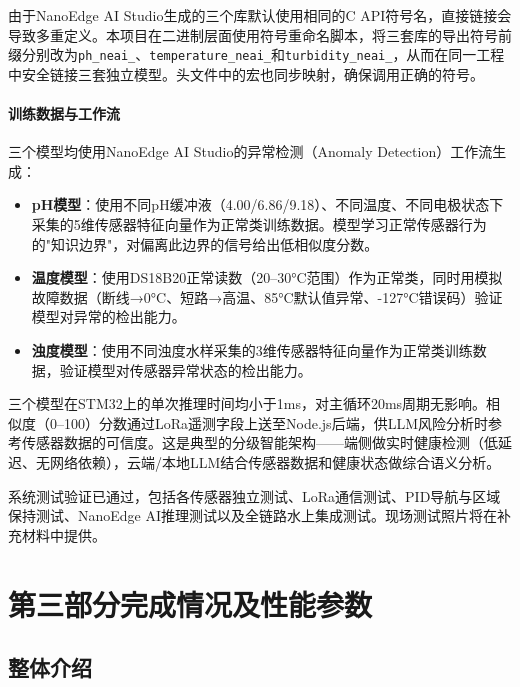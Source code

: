 \documentclass[12pt,a4paper]{ctexart}
\begin{document}
由于NanoEdge AI Studio生成的三个库默认使用相同的C API符号名，直接链接会导致多重定义。本项目在二进制层面使用符号重命名脚本，将三套库的导出符号前缀分别改为\texttt{ph\_neai\_}、\texttt{temperature\_neai\_}和\texttt{turbidity\_neai\_}，从而在同一工程中安全链接三套独立模型。头文件中的宏也同步映射，确保调用正确的符号。

\paragraph{训练数据与工作流}

三个模型均使用NanoEdge AI Studio的异常检测（Anomaly Detection）工作流生成：
\begin{itemize}
    \item \textbf{pH模型}：使用不同pH缓冲液（4.00/6.86/9.18）、不同温度、不同电极状态下采集的5维传感器特征向量作为正常类训练数据。模型学习正常传感器行为的"知识边界"，对偏离此边界的信号给出低相似度分数。
    \item \textbf{温度模型}：使用DS18B20正常读数（20--30°C范围）作为正常类，同时用模拟故障数据（断线→0°C、短路→高温、85°C默认值异常、-127°C错误码）验证模型对异常的检出能力。
    \item \textbf{浊度模型}：使用不同浊度水样采集的3维传感器特征向量作为正常类训练数据，验证模型对传感器异常状态的检出能力。
\end{itemize}

三个模型在STM32上的单次推理时间均小于1ms，对主循环20ms周期无影响。相似度（0--100）分数通过LoRa遥测字段上送至Node.js后端，供LLM风险分析时参考传感器数据的可信度。这是典型的分级智能架构——端侧做实时健康检测（低延迟、无网络依赖），云端/本地LLM结合传感器数据和健康状态做综合语义分析。

系统测试验证已通过，包括各传感器独立测试、LoRa通信测试、PID导航与区域保持测试、NanoEdge AI推理测试以及全链路水上集成测试。现场测试照片将在补充材料中提供。

\section{第三部分\quad 完成情况及性能参数}

\subsection{整体介绍}
\end{document}
